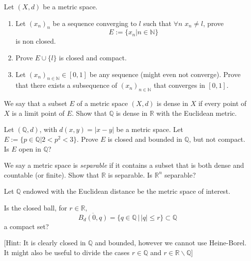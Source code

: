\documentclass[11pt]{article}%
\newcommand{\R}{\mathbb{R}}
\newcommand{\Q}{\mathbb{Q}}
\begin{document}
\begin{Exercise} [title=**$\dagger$]
	Let $(X,d)$ be a metric space.
\begin{enumerate}
	\item Let $(x_n)_n$ be a sequence converging to $l$ such that $\forall n$ $x_n\neq l$, prove $$E:=\{x_n| n\in\mathbb{N} \}$$ is non closed.
	\item Prove $E\cup \{l\}$ is closed and compact.
	\item Let $(x_n)_{n\in\mathbb{N}}\in [0,1]$ be any sequence (might even not converge). Prove that there exists a subsequence of $(x_n)_{n\in\mathbb{N}}$ that converges in $[0,1]$.
\end{enumerate}
\end{Exercise}

\begin{Exercise}[title=*$\dagger$]
	We say that a subset $E$ of a metric space $(X,d)$ is dense in $X$ if every point of $X$ is a limit point of $E$. Show that $\Q$ is dense in $\R$ with the Euclidean metric.
\end{Exercise}

\begin{Exercise}[title=**]
Let $(\mathbb{Q},d)$, with $d(x,y)=|x-y|$ be a metric space. Let $E:=\{ p\in\mathbb{Q}| 2<p^2<3 \}$. Prove $E$ is closed and bounded in $\mathbb{Q}$, but not compact. Is $E$ open in $\mathbb{Q}$?
\end{Exercise}

\begin{Exercise}[title=*]
We say a metric space is \emph{separable} if it contains a subset that is both dense and countable (or finite). Show that $\mathbb R$ is separable. Is $\mathbb R^n$ separable?
\end{Exercise}


\begin{Exercise}[title=**$\dagger$]
	Let $\Q$ endowed with the Euclidean distance be the metric space of interest.
	
	Is the closed ball, for $r\in\R$,
\[
\overline{B_d(0,q)}=\{q\in{\mathbb Q}\,|\,|q|\leq r\}\subset{\mathbb Q}
\]
a compact set?


[Hint: It is clearly closed in ${\mathbb Q}$ and bounded, however we cannot use Heine-Borel. It might also be useful to divide the cases $r\in\Q$ and $r\in\R\backslash\Q$]
\end{Exercise}
\end{document}
